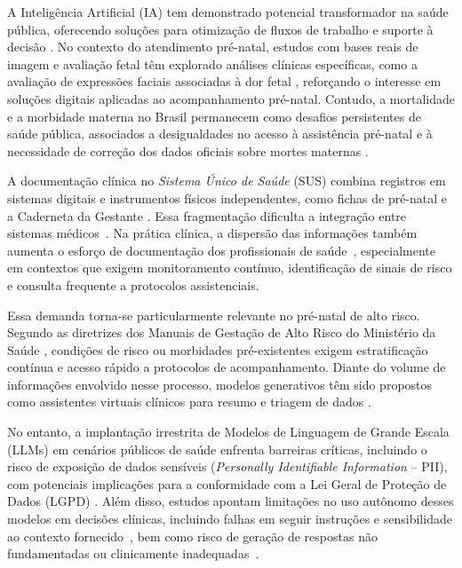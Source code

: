 A Inteligência Artificial (IA) tem demonstrado potencial transformador na saúde pública, oferecendo soluções para otimização de fluxos de trabalho e suporte à decisão \cite{Rajpurkar2022, Cabitza2022, zuin2022prediction, zuin2025community}.
No contexto do atendimento pré-natal, estudos com bases reais de imagem e avaliação fetal têm explorado análises clínicas específicas, como a avaliação de expressões faciais associadas à dor fetal \cite{Rosa2020FetalPain, Bernardes2022FetalPain}, reforçando o interesse em soluções digitais aplicadas ao acompanhamento pré-natal.
Contudo, a mortalidade e a morbidade materna no Brasil permanecem como desafios persistentes de saúde pública, associados a desigualdades no acesso à assistência pré-natal e à necessidade de correção dos dados oficiais sobre mortes maternas \cite{AcessoPreNatal2018, Laurenti2010}.

A documentação clínica no \textit{Sistema Único de Saúde} (SUS) combina registros em sistemas digitais e instrumentos físicos independentes, como fichas de pré-natal e a Caderneta da Gestante \cite{FichaPreNatal2018, CadernetaGestante2024}. Essa fragmentação dificulta a integração entre sistemas médicos~\cite{cifuentes2015electronic, kruse2016challenges}. Na prática clínica, a dispersão das informações também aumenta o esforço de documentação dos profissionais de saúde~\cite{moy2021measurement, moy2023understanding}, especialmente em contextos que exigem monitoramento contínuo, identificação de sinais de risco e consulta frequente a protocolos assistenciais. 

Essa demanda torna-se particularmente relevante no pré-natal de alto risco. Segundo as diretrizes dos Manuais de Gestação de Alto Risco do Ministério da Saúde \cite{ManualAltoRisco2022, ManualAltoRisco2012}, condições de risco ou morbidades pré-existentes exigem estratificação contínua e acesso rápido a protocolos de acompanhamento. Diante do volume de informações envolvido nesse processo, modelos generativos têm sido propostos como assistentes virtuais clínicos para resumo e triagem de dados \cite{Clusmann2023, Rajpurkar2022}.

No entanto, a implantação irrestrita de Modelos de Linguagem de Grande Escala (LLMs) em cenários públicos de saúde enfrenta barreiras críticas, incluindo o risco de exposição de dados sensíveis (\textit{Personally Identifiable Information} -- PII), com potenciais implicações para a conformidade com a Lei Geral de Proteção de Dados (LGPD) \cite{OWASPLLM2025, LGPD2018}. Além disso, estudos apontam limitações no uso autônomo desses modelos em decisões clínicas, incluindo falhas em seguir instruções e sensibilidade ao contexto fornecido~\cite{hager2024evaluation}, bem como risco de geração de respostas não fundamentadas ou clinicamente inadequadas~\cite{asgari2025framework}.


